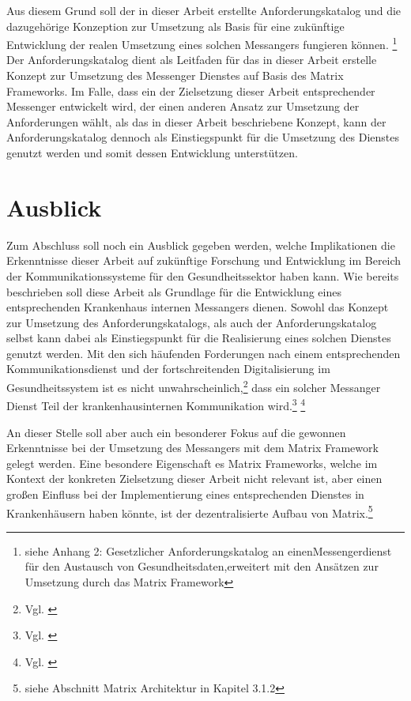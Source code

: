 Aus diesem Grund soll der in dieser Arbeit erstellte Anforderungskatalog und die dazugehörige Konzeption zur Umsetzung als Basis für eine zukünftige Entwicklung der realen Umsetzung eines solchen Messangers fungieren können. \footnote{siehe Anhang 2: Gesetzlicher Anforderungskatalog an einenMessengerdienst für den Austausch von Gesundheitsdaten,erweitert mit den Ansätzen zur Umsetzung durch das Matrix Framework} 
Der Anforderungskatalog dient als Leitfaden für das in dieser Arbeit erstelle Konzept zur Umsetzung des Messenger Dienstes auf Basis des Matrix Frameworks. Im Falle, dass ein der Zielsetzung dieser Arbeit entsprechender Messenger entwickelt wird, der einen anderen Ansatz zur Umsetzung der Anforderungen wählt, als das in dieser Arbeit beschriebene Konzept, kann der Anforderungskatalog dennoch als Einstiegspunkt für die Umsetzung des Dienstes genutzt werden und somit dessen Entwicklung unterstützen.

\section{Ausblick}\label{chapter:fazit}
Zum Abschluss soll noch ein Ausblick gegeben werden, welche Implikationen die Erkenntnisse dieser Arbeit auf zukünftige Forschung und Entwicklung im Bereich der Kommunikationssysteme für den Gesundheitssektor haben kann. Wie bereits beschrieben soll diese Arbeit als Grundlage für die Entwicklung eines entsprechenden Krankenhaus internen Messangers dienen. Sowohl das Konzept zur Umsetzung des Anforderungskatalogs, als auch der Anforderungskatalog selbst kann dabei als Einstiegspunkt für die Realisierung eines solchen Dienstes genutzt werden. Mit den sich häufenden Forderungen nach einem entsprechenden Kommunikationsdienst und der fortschreitenden Digitalisierung im Gesundheitssystem ist es nicht unwahrscheinlich,\footnote{Vgl. \cite[S. 24 ff.]{Finn2009}} dass ein solcher Messanger Dienst Teil der krankenhausinternen Kommunikation wird.\footnote{Vgl. \cite[S. 2]{Bundesaerztekammer2020}} \footnote{Vgl. \cite{Giesselmann2018}}

An dieser Stelle soll aber auch ein besonderer Fokus auf die gewonnen Erkenntnisse bei der Umsetzung des Messangers mit dem Matrix Framework gelegt werden. Eine besondere Eigenschaft es Matrix Frameworks, welche im Kontext der konkreten Zielsetzung dieser Arbeit nicht relevant ist, aber einen großen Einfluss bei der Implementierung eines entsprechenden Dienstes in Krankenhäusern haben könnte, ist der dezentralisierte Aufbau von Matrix.\footnote{siehe Abschnitt Matrix Architektur in Kapitel 3.1.2}


